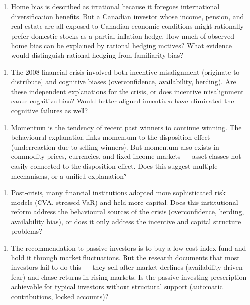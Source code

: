 \documentclass[12pt, letterpaper]{article}
\begin{document}
\begin{enumerate}
\item Home bias is described as irrational because it foregoes international diversification benefits. But a Canadian investor whose income, pension, and real estate are all exposed to Canadian economic conditions might rationally prefer domestic stocks as a partial inflation hedge. How much of observed home bias can be explained by rational hedging motives? What evidence would distinguish rational hedging from familiarity bias?
\end{enumerate}

\begin{enumerate}
\item The 2008 financial crisis involved both incentive misalignment (originate-to-distribute) and cognitive biases (overconfidence, availability, herding). Are these independent explanations for the crisis, or does incentive misalignment cause cognitive bias? Would better-aligned incentives have eliminated the cognitive failures as well?
\end{enumerate}

\begin{enumerate}
\item Momentum is the tendency of recent past winners to continue winning. The behavioural explanation links momentum to the disposition effect (underreaction due to selling winners). But momentum also exists in commodity prices, currencies, and fixed income markets --- asset classes not easily connected to the disposition effect. Does this suggest multiple mechanisms, or a unified explanation?
\end{enumerate}

\begin{enumerate}
\item Post-crisis, many financial institutions adopted more sophisticated risk models (CVA, stressed VaR) and held more capital. Does this institutional reform address the behavioural sources of the crisis (overconfidence, herding, availability bias), or does it only address the incentive and capital structure problems?
\end{enumerate}

\begin{enumerate}
\item The recommendation to passive investors is to buy a low-cost index fund and hold it through market fluctuations. But the research documents that most investors fail to do this --- they sell after market declines (availability-driven fear) and chase returns in rising markets. Is the passive investing prescription achievable for typical investors without structural support (automatic contributions, locked accounts)?
\end{enumerate}
\end{document}
